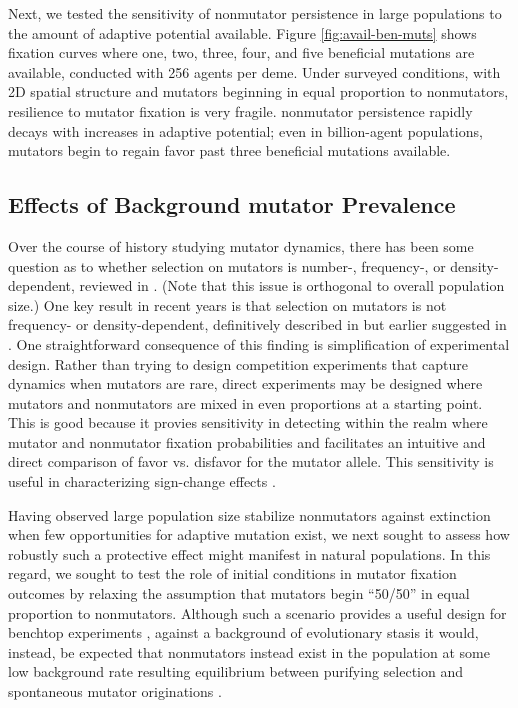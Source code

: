 

Next, we tested the sensitivity of nonmutator persistence in large populations to the amount of adaptive potential available.
Figure \ref{fig:avail-ben-muts} shows fixation curves where one, two, three, four, and five beneficial mutations are available, conducted with 256 agents per deme.
Under surveyed conditions, with 2D spatial structure and mutators beginning in equal proportion to nonmutators, resilience to mutator fixation is very fragile.
nonmutator persistence rapidly decays with increases in adaptive potential;
even in billion-agent populations, mutators begin to regain favor past three beneficial mutations available.



\subsection{Effects of Background mutator Prevalence}
\label{sec:background-hypermutator-prevalence}

Over the course of history studying mutator dynamics, there has been some question as to whether selection on mutators is number-, frequency-, or density-dependent, reviewed in \citep{raynes2019selection}.
(Note that this issue is orthogonal to overall population size.)
One key result in recent years is that selection on mutators is not frequency- or density-dependent, definitively described in \citep{raynes2019selection} but earlier suggested in \citep{wylie2009fixation}.
One straightforward consequence of this finding is simplification of experimental design.
Rather than trying to design competition experiments that capture dynamics when mutators are rare, direct experiments may be designed where mutators and nonmutators are mixed in even proportions at a starting point.
This is good because it provies sensitivity in detecting within the realm where mutator and nonmutator fixation probabilities and facilitates an intuitive and direct comparison of favor vs. disfavor for the mutator allele.
This sensitivity is useful in characterizing sign-change effects \citep{raynes2018selection}.



Having observed large population size stabilize nonmutators against extinction when few opportunities for adaptive mutation exist, we next sought to assess how robustly such a protective effect might manifest in natural populations.
In this regard, we sought to test the role of initial conditions in mutator fixation outcomes by relaxing the assumption that mutators begin ``50/50'' in equal proportion to nonmutators.
Although such a scenario provides a useful design for benchtop experiments \citep{raynes2018sign}, against a background of evolutionary stasis it would, instead, be expected that nonmutators instead exist in the population at some low background rate resulting equilibrium between purifying selection and spontaneous mutator originations \citep{desai2011balance,johnson1999approach}.

